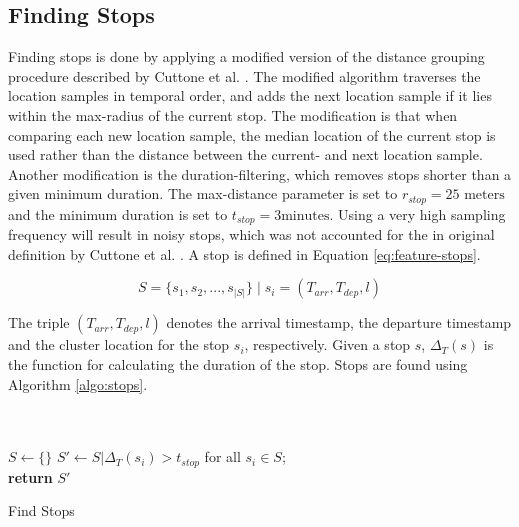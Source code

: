 \subsection{Finding Stops}
Finding stops is done by applying a modified version of the distance grouping procedure described by Cuttone et al. \cite{sparse-location-2014}. The modified algorithm traverses the location samples in temporal order, and adds the next location sample if it lies within the max-radius of the current stop. The modification is that when comparing each new location sample, the median location of the current stop is used rather than the distance between the current- and next location sample. Another modification is the duration-filtering, which removes stops shorter than a given minimum duration. The max-distance parameter is set to $r_{stop} = 25 \text{ meters}$ and the minimum duration is set to $t_{stop} = 3 \text{minutes}$. Using a very high sampling frequency will result in noisy stops, which was not accounted for the in original definition by Cuttone et al. \cite{sparse-location-2014}. A stop is defined in Equation \eqref{eq:feature-stops}.

\begin{equation}
\label{eq:feature-stops}
S = \{s_1, s_2, ..., s_{|S|}\} \;| \; s_i = (T_{arr}, T_{dep}, l)
\end{equation}

The triple $(T_{arr}, T_{dep}, l)$ denotes the arrival timestamp, the departure timestamp and the cluster location for the stop $s_i$, respectively. Given a stop $s$, $\Delta_ T(s)$ is the function for calculating the duration of the stop. Stops are found using Algorithm \ref{algo:stops}.

\begin{algorithm}[H]
\SetAlgoLined
{}\\
\\

 $S \leftarrow \{ \}$\;
 $S' \leftarrow S | \Delta_ T(s_i) > t_{stop}$ for all $s_i \in S$;\\
 \textbf{return} $S'$\;
 \label{algo:stops}
 \caption{Find Stops}
\end{algorithm}

